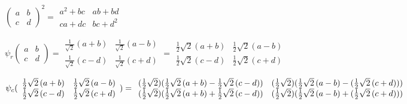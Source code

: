 \documentclass{article}
\begin{document}
$(
\begin{array}{cc}
a & b \\ 
c & d
\end{array}
)^{2}=\allowbreak 
\begin{array}{cc}
a^{2}+bc & ab+bd \\ 
ca+dc & bc+d^{2}
\end{array}
$

$\psi _{r}(
\begin{array}{cc}
a & b \\ 
c & d
\end{array}
)=
\begin{array}{cc}
\frac{1}{\sqrt{2}}(a+b) & \frac{1}{\sqrt{2}}(a-b) \\ 
\frac{1}{\sqrt{2}}(c-d) & \frac{1}{\sqrt{2}}(c+d)
\end{array}
=\allowbreak 
\begin{array}{cc}
\frac{1}{2}\sqrt{2}\left( a+b\right)  & \frac{1}{2}\sqrt{2}\left( a-b\right) 
\\ 
\frac{1}{2}\sqrt{2}\left( c-d\right)  & \frac{1}{2}\sqrt{2}\left( c+d\right) 
\end{array}
\allowbreak $

$\psi _{c}(\allowbreak 
\begin{array}{cc}
\frac{1}{2}\sqrt{2}\left( a+b\right)  & \frac{1}{2}\sqrt{2}\left( a-b\right) 
\\ 
\frac{1}{2}\sqrt{2}\left( c-d\right)  & \frac{1}{2}\sqrt{2}\left( c+d\right) 
\end{array}
\allowbreak )=
\begin{array}{cc}
(\frac{1}{2}\sqrt{2})(\frac{1}{2}\sqrt{2}\left( a+b\right) -\frac{1}{2}\sqrt{%
2}\left( c-d\right) ) & (\frac{1}{2}\sqrt{2})(\frac{1}{2}\sqrt{2}\left(
a-b\right) -(\frac{1}{2}\sqrt{2}\left( c+d\right) )) \\ 
(\frac{1}{2}\sqrt{2})(\frac{1}{2}\sqrt{2}\left( a+b\right) +\frac{1}{2}\sqrt{%
2}\left( c-d\right) ) & (\frac{1}{2}\sqrt{2})(\frac{1}{2}\sqrt{2}\left(
a-b\right) +(\frac{1}{2}\sqrt{2}\left( c+d\right) ))
\end{array}
\allowbreak $
\end{document}
